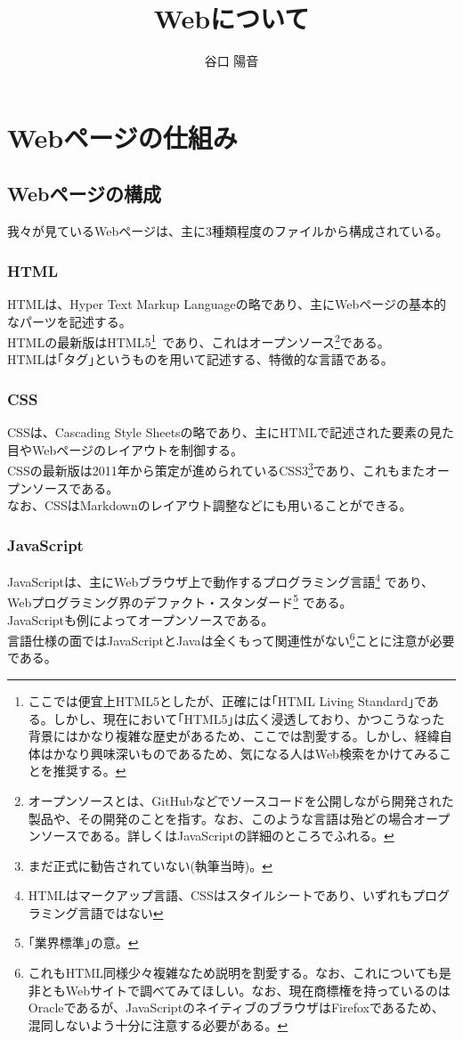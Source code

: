 \documentclass{ltjsarticle}
\begin{document}
\title{Webについて}
\author{谷口  陽音}
\maketitle

\section{Webページの仕組み}
\subsection{Webページの構成}
我々が見ているWebページは、主に3種類程度のファイルから構成されている。
\subsubsection{HTML}
HTMLは、Hyper Text Markup Languageの略であり、主にWebページの基本的なパーツを記述する。\\
HTMLの最新版はHTML5\footnote[1]
{ここでは便宜上HTML5としたが、正確には｢HTML Living Standard｣である。しかし、現在において｢HTML5｣は広く浸透しており、かつこうなった背景にはかなり複雑な歴史があるため、ここでは割愛する。しかし、経緯自体はかなり興味深いものであるため、気になる人はWeb検索をかけてみることを推奨する。}\
であり、これはオープンソース\footnote[2] {オープンソースとは、GitHubなどでソースコードを公開しながら開発された製品や、その開発のことを指す。なお、このような言語は殆どの場合オープンソースである。詳しくはJavaScriptの詳細のところでふれる。}である。\\
HTMLは｢タグ｣というものを用いて記述する、特徴的な言語である。

\subsubsection{CSS}
CSSは、Cascading Style Sheetsの略であり、主にHTMLで記述された要素の見た目やWebページのレイアウトを制御する。\\
CSSの最新版は2011年から策定が進められているCSS3\footnote[3]{まだ正式に勧告されていない(執筆当時)。}であり、これもまたオープンソースである。\\
なお、CSSはMarkdownのレイアウト調整などにも用いることができる。

\subsubsection{JavaScript}
JavaScriptは、主にWebブラウザ上で動作するプログラミング言語\footnote[4]{HTMLはマークアップ言語、CSSはスタイルシートであり、いずれもプログラミング言語ではない}  であり、Webプログラミング界のデファクト・スタンダード\footnote[5]{｢業界標準｣の意。} である。\\
JavaScriptも例によってオープンソースである。\\
言語仕様の面ではJavaScriptとJavaは全くもって関連性がない\footnote[6]{これもHTML同様少々複雑なため説明を割愛する。なお、これについても是非ともWebサイトで調べてみてほしい。なお、現在商標権を持っているのはOracleであるが、JavaScriptのネイティブのブラウザはFirefoxであるため、混同しないよう十分に注意する必要がある。}ことに注意が必要である。
\end{document}
